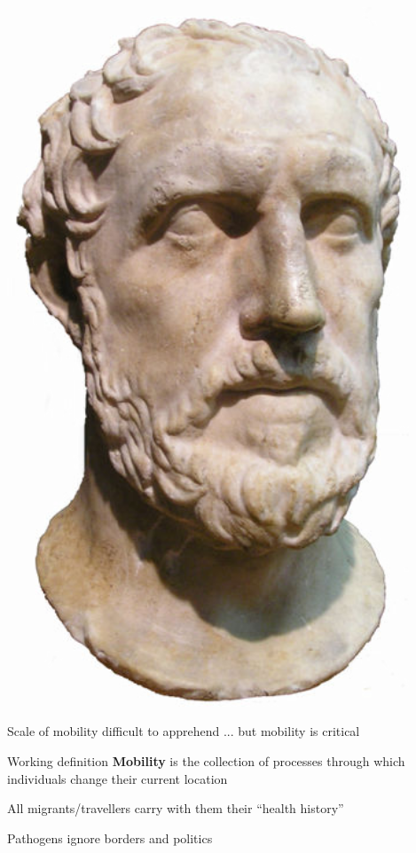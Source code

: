\documentclass[aspectratio=169]{beamer}\usepackage[]{graphicx}\usepackage[]{xcolor}
\begin{document}
{\begin{minipage}{0.25\textwidth}
\begin{center}
\includegraphics[width=0.9\textwidth]{FIGS/Thucydides-bust-noBG}
\end{center}
\end{minipage}
}

\begin{frame}{Scale of mobility difficult to apprehend ... but mobility is critical}
\begin{block}{Working definition}
\textbf{Mobility} is the collection of processes through which individuals change their current location
\end{block}
\vfill
\begin{block}{}
All migrants/travellers carry with them their ``health history''
\end{block}
\vfill
\begin{block}{}
Pathogens ignore borders and politics
\end{block}     
\end{frame}
	
\end{document}
